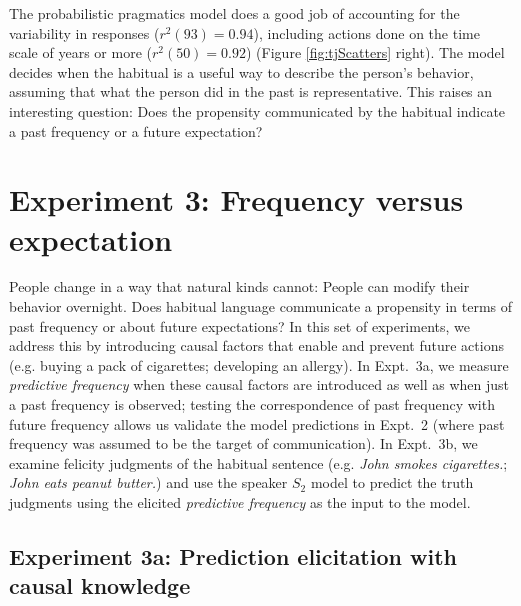 \documentclass[10pt,letterpaper]{article}
\newcommand{\ndg}[1]{\textcolor{Green}{[ndg: #1]}}
\begin{document}
The probabilistic pragmatics model does a good job of accounting for the variability in responses ($r^2(93) = 0.94$), including actions done on the time scale of years or more  ($r^2(50) = 0.92$) (Figure \ref{fig:tjScatters} right).
The model decides when the habitual is a useful way to describe the person's behavior, assuming that what the person did in the past is representative. 
This raises an interesting question: Does the propensity communicated by the habitual indicate a past frequency or a future expectation?


\section{Experiment 3: Frequency versus expectation}

People change in a way that natural kinds cannot: People can modify their behavior overnight.
Does habitual language communicate a propensity in terms of past frequency or about future expectations?
In this set of experiments, we address this by introducing causal factors that enable and prevent future actions (e.g. buying a pack of cigarettes; developing an allergy).
In Expt.~3a, we measure \emph{predictive frequency} when these causal factors are introduced as well as when just a past frequency is observed; testing the correspondence of past frequency with future frequency allows us validate the model predictions in Expt.~2 (where past frequency was assumed to be the target of communication).
In Expt.~3b, we examine felicity judgments of the habitual sentence (e.g. \emph{John smokes cigarettes.}; \emph{John eats peanut butter.}) and use the speaker $S_2$ model to predict the truth judgments using the elicited \emph{predictive frequency}  as the input to the model.

\subsection{Experiment 3a: Prediction elicitation with causal knowledge}
\end{document}
